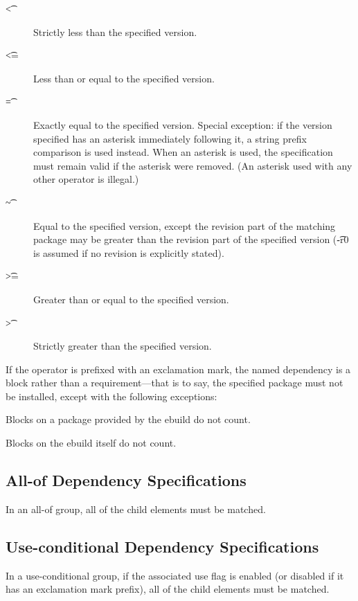 \begin{description}
\item[\t{<}] Strictly less than the specified version.
\item[\t{<=}] Less than or equal to the specified version.
\item[\t{=}] Exactly equal to the specified version. Special exception: if the version
    specified has an asterisk immediately following it, a string prefix comparison is
    used instead. When an asterisk is used, the specification must remain valid if the
    asterisk were removed. (An asterisk used with any other operator is illegal.)
\item[\t{\~}] Equal to the specified version, except the revision part of the matching
    package may be greater than the revision part of the specified version (\t{-r0} is
    assumed if no revision is explicitly stated).
\item[\t{>=}] Greater than or equal to the specified version.
\item[\t{>}] Strictly greater than the specified version.
\end{description}

If the operator is prefixed with an exclamation mark, the named dependency is a block
rather than a requirement---that is to say, the specified package must not be
installed, except with the following exceptions:

\begin{bulletlist}
\item Blocks on a package provided by the ebuild do not count. \label{provided-blocks}
\item Blocks on the ebuild itself do not count.
\end{bulletlist}

\subsection{All-of Dependency Specifications}

In an all-of group, all of the child elements must be matched.

\subsection{Use-conditional Dependency Specifications}

In a use-conditional group, if the associated use flag is enabled (or disabled if it has an
exclamation mark prefix), all of the child elements must be matched.

